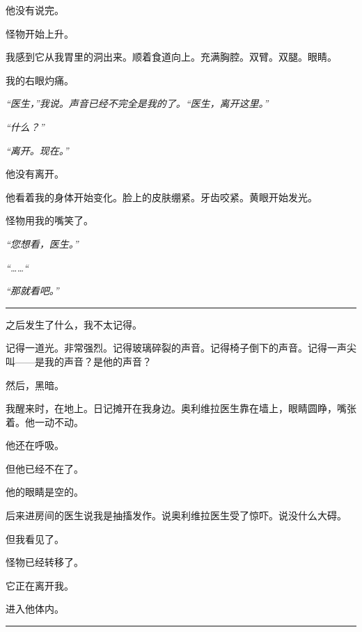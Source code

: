 \noindent 他没有说完。

\noindent 怪物开始上升。

\noindent 我感到它从我胃里的洞出来。顺着食道向上。充满胸腔。双臂。双腿。眼睛。

\noindent 我的右眼灼痛。

\noindent \textit{“医生，”我说。声音已经不完全是我的了。“医生，离开这里。”}

\noindent \textit{“什么？”}

\noindent \textit{“离开。现在。”}

\noindent 他没有离开。

\noindent 他看着我的身体开始变化。脸上的皮肤绷紧。牙齿咬紧。黄眼开始发光。

\noindent 怪物用我的嘴笑了。

\noindent \textit{“您想看，医生。”}

\noindent \textit{“……“}

\noindent \textit{“那就看吧。”}

\vspace{0.5em}\noindent\rule{\textwidth}{0.5pt}\vspace{0.5em}

\noindent 之后发生了什么，我不太记得。

\noindent 记得一道光。非常强烈。记得玻璃碎裂的声音。记得椅子倒下的声音。记得一声尖叫——是我的声音？是他的声音？

\noindent 然后，黑暗。

\noindent 我醒来时，在地上。日记摊开在我身边。奥利维拉医生靠在墙上，眼睛圆睁，嘴张着。他一动不动。

\noindent 他还在呼吸。

\noindent 但他已经不在了。

\noindent 他的眼睛是空的。

\noindent 后来进房间的医生说我是抽搐发作。说奥利维拉医生受了惊吓。说没什么大碍。

\noindent 但我看见了。

\noindent 怪物已经转移了。

\noindent 它正在离开我。

\noindent 进入他体内。

\vspace{0.5em}\noindent\rule{\textwidth}{0.5pt}\vspace{0.5em}

